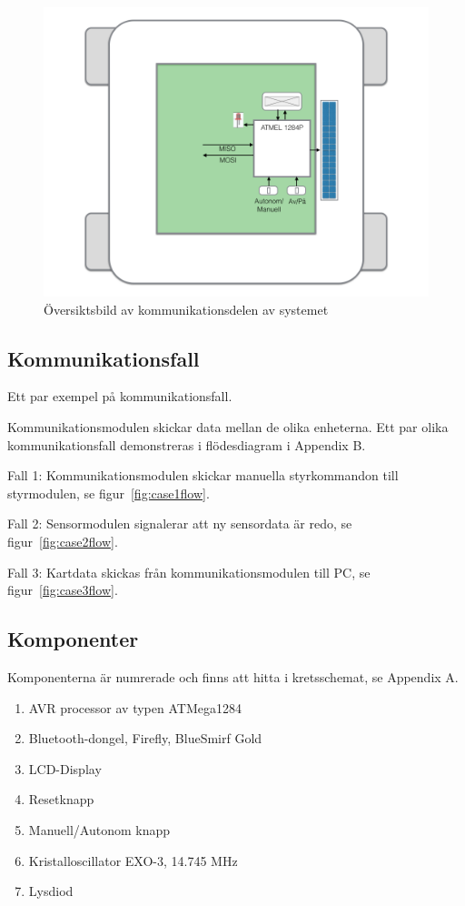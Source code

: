 \documentclass[a4paper,12pt,fleqn]{article}
\begin{document}
\begin{figure}[htp] %
  \begin{center}
  \includegraphics[keepaspectratio=true,width=\linewidth]{bilder/kom_overview.png}  %
  \end{center}
  \caption{Översiktsbild av kommunikationsdelen av systemet} %
  \label{fig:overviewKom}
\end{figure}
\newpage
\subsection{Kommunikationsfall}
Ett par exempel på kom\-mun\-ikations\-fall.

Kommunikationsmodulen skickar data mellan de olika enheterna. Ett par olika kommunikationsfall demonstreras i flödesdiagram i Appendix B.

Fall 1: Kommunikationsmodulen skickar manuella styrkommandon till styrmodulen, se figur~\ref{fig:case1flow}.

Fall 2: Sensormodulen signalerar att ny sensordata är redo, se  figur~\ref{fig:case2flow}.

Fall 3: Kartdata skickas från kommunikationsmodulen till PC, se figur~\ref{fig:case3flow}. 
 
\subsection{Komponenter}
Komponenterna är numrerade och finns att hitta i kretsschemat, se Appendix A.
\begin{enumerate}
  \item AVR processor av typen ATMega1284
  \item Bluetooth-dongel, Firefly, BlueSmirf Gold
  \item LCD-Display
  \item Resetknapp
  \item Manuell/Autonom knapp
  \item Kristalloscillator EXO-3, 14.745 MHz
  \item Lysdiod
\end{enumerate}
\end{document}
